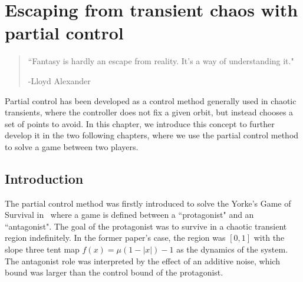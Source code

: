 \chapter{Escaping from transient chaos with partial control} %
\label{chap:ForcingEscape}


\begin{quotation}
	\vspace{-3cm}
    \begin{flushright}
    \begin{minipage}[t][5cm][b]{0.5\textwidth}
    { ``Fantasy is hardly an escape from reality. It's a way of understanding it."}
    
    \bigskip
    
    -{\small  Lloyd Alexander}
    \end{minipage}
    \end{flushright}
    
    \vspace{0.5cm}
\end{quotation}



\vspace{0.5cm}


\let\thefootnote\relax{}



\vspace{1cm}



Partial control has been developed as a control method generally used in chaotic transients, where the controller does not fix a given orbit, but instead chooses a set of points to avoid. In this chapter, we introduce this concept to further develop it in the two following chapters, where we use the partial control method to solve a game between two players. 

\section{Introduction}

The partial control method was firstly introduced to solve the Yorke's Game of Survival in~\cite{Yorke'sGame} where a game is defined between a ``protagonist" and an ``antagonist". The goal of the protagonist was to survive in a chaotic transient region indefinitely. In the former paper's case, the region was $[0,1]$ with the slope three tent map $f(x) = \mu(1-|x|)-1$ as the dynamics of the system. The antagonist role was interpreted by the effect of an additive noise, which bound was larger than the control bound of the protagonist.

